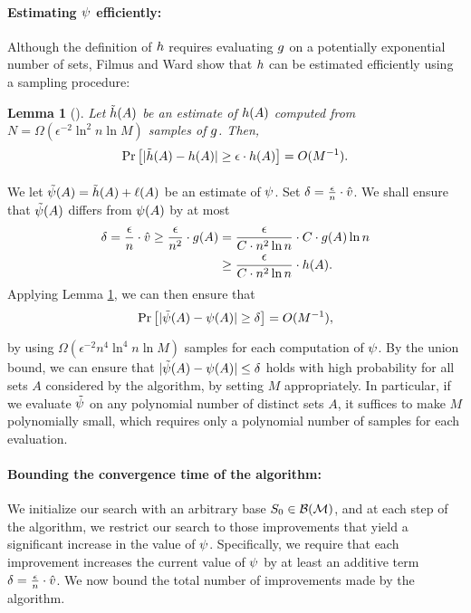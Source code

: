 \documentclass{article}
\DeclareMathOperator*{\probOp}{\mathrm{Pr}}
\newcommand{\prob}[2][]{\probOp_{#1}\left[#2\right]}
\newtheorem{lemma}[theorem]{Lemma}
\theoremstyle{definition}
\begin{document}
\paragraph{Estimating $\psi$ efficiently:}

Although the definition of $h$ requires evaluating $g$ on a potentially exponential number of sets, Filmus and Ward show that $h$ can be estimated efficiently using a sampling procedure:
\begin{lemma}[{\cite[Lemma 5.1, p.\ 525]{Filmus2014}}]
\label{lem:NOsubmodEst}
Let $\tilde{h}(A)$ be an estimate of $h(A)$ computed from $N\!=\Omega(\epsilon^{-2}\ln^{2}n\ln M)$ samples of $g$.  Then, 
\[
\prob{|\NOsubmodEst(A) - \NOsubmod(A)| \ge \epsilon \cdot \NOsubmod(A)} = O(M^{-1}).
\]
\end{lemma}
We let $\tilde{\psi}(A) = \tilde{h}(A) + \ell(A)$ be an estimate of $\psi$.  Set $\delta = \frac{\epsilon}{n}\cdot \hat{v}$.
We shall ensure that $\tilde{\psi}(A)$ differs from $\psi(A)$ by at most
\begin{align*}
\delta = \frac{\epsilon}{n}\cdot \hat{v} \ge \frac{\epsilon}{n^{2}}\cdot g(A) 
&= \frac{\epsilon}{C\cdot n^{2} \ln n}\cdot C\cdot g(A) \ln n \\
&\ge \frac{\epsilon}{C\cdot n^{2} \ln n}\cdot h(A).
\end{align*}
Applying Lemma \ref{lem:NOsubmodEst}, we can then ensure that
\[
\prob{|\potEst(A) - \pot(A)| \ge \delta} = O(M^{-1}),
\]
by using $\Omega(\epsilon^{-2}n^{4}\ln^{4}n\ln M)$ samples for each computation of $\psi$.  By the union bound, we can ensure that $|\tilde{\psi}(A) - \psi(A)| \le \delta$ holds with high probability for all sets $A$ considered by the algorithm, by setting $M$ appropriately.  In particular, if we evaluate $\tilde{\psi}$ on any polynomial number of distinct sets $A$, it suffices to make $M$ polynomially small, which requires only  a polynomial number of samples for each evaluation.

\paragraph{Bounding the convergence time of the algorithm:}

We initialize our search with an arbitrary base $S_{0} \in \mathcal{B}(\mathcal{M})$, and at each step of the algorithm, we restrict our search to those improvements that yield a significant increase in the value of $\psi$.  Specifically, we require that each improvement increases the current value of $\psi$ by at least an additive term $\delta = \frac{\epsilon}{n}\cdot \hat{v}$.  We now bound the total number of improvements made by the algorithm.
\end{document}

